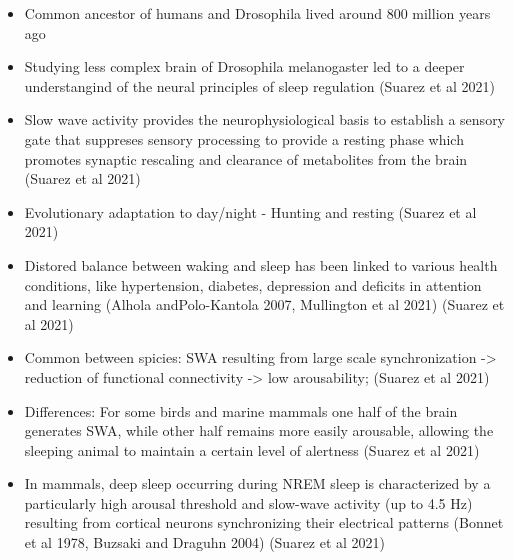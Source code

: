 \documentclass[11pt]{article}
\begin{document}
\begin{itemize}
    \item Common ancestor of humans and Drosophila lived around 800 million
    years ago \parencite{williamsLongReachNAAG2021}

    \item Studying less complex brain of
    Drosophila melanogaster led to a deeper understangind of the neural
    principles of sleep regulation \parencite{suarez-grimaltNeuralArchitectureSleep2021}
    (Suarez et al 2021)

    \item Slow wave activity provides the neurophysiological basis to establish a
    sensory gate that suppreses sensory processing to
    provide a resting phase which promotes synaptic rescaling and
    clearance of metabolites from the brain \parencite{suarez-grimaltNeuralArchitectureSleep2021}
    (Suarez et al 2021)
    \item Evolutionary adaptation to day/night - Hunting and resting \parencite{suarez-grimaltNeuralArchitectureSleep2021}
    (Suarez et al 2021)

    \item Distored balance between waking and sleep has been linked to various
    health conditions, like hypertension, diabetes, depression and deficits in
    attention and learning (Alhola andPolo-Kantola 2007, Mullington et al 2021)
    \parencite{suarez-grimaltNeuralArchitectureSleep2021}
    (Suarez et al 2021)

    \item Common between spicies: SWA resulting from large scale synchronization
    -> reduction of functional connectivity -> low arousability;
    \parencite{suarez-grimaltNeuralArchitectureSleep2021}
    (Suarez et al 2021)

    \item Differences: For some birds and marine mammals one half of the brain
    generates SWA, while other half remains more easily arousable, allowing
    the sleeping animal to maintain a certain level of alertness \parencite{suarez-grimaltNeuralArchitectureSleep2021}
    (Suarez et al 2021)

    \item In mammals, deep sleep occurring during NREM sleep is characterized
    by a particularly high arousal threshold and slow-wave activity (up to 4.5 Hz)
    resulting from cortical neurons synchronizing their electrical patterns (Bonnet et al 1978,
    Buzsaki and Draguhn 2004) \parencite{suarez-grimaltNeuralArchitectureSleep2021}
    (Suarez et al 2021)


\end{itemize}
\end{document}
